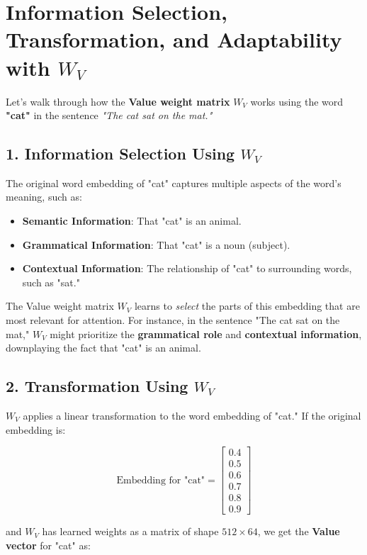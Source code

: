 \documentclass{article}
\begin{document}
\section*{Information Selection, Transformation, and Adaptability with \( W_V \)}

Let's walk through how the \textbf{Value weight matrix} \( W_V \) works using the word \textbf{"cat"} in the sentence \textit{"The cat sat on the mat."}

\subsection*{1. Information Selection Using \( W_V \)}

The original word embedding of "cat" captures multiple aspects of the word’s meaning, such as:
\begin{itemize}
    \item \textbf{Semantic Information}: That "cat" is an animal.
    \item \textbf{Grammatical Information}: That "cat" is a noun (subject).
    \item \textbf{Contextual Information}: The relationship of "cat" to surrounding words, such as "sat."
\end{itemize}

The Value weight matrix \( W_V \) learns to \textit{select} the parts of this embedding that are most relevant for attention. For instance, in the sentence "The cat sat on the mat," \( W_V \) might prioritize the \textbf{grammatical role} and \textbf{contextual information}, downplaying the fact that "cat" is an animal.

\subsection*{2. Transformation Using \( W_V \)}

\( W_V \) applies a linear transformation to the word embedding of "cat." If the original embedding is:

\[
\text{Embedding for "cat"} = \begin{bmatrix} 0.4 \\ 0.5 \\ 0.6 \\ 0.7 \\ 0.8 \\ 0.9 \end{bmatrix}
\]

and \( W_V \) has learned weights as a matrix of shape \( 512 \times 64 \), we get the \textbf{Value vector} for "cat" as:
\end{document}
